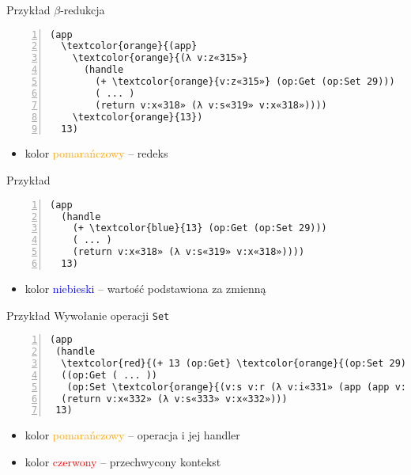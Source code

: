\documentclass{beamer}
\begin{document}
\begin{frame}[fragile]{Przykład}
$\beta$-redukcja
\begin{Verbatim}[commandchars=\\\{\},numbers=left]
(app
  \textcolor{orange}{(app}
    \textcolor{orange}{(λ v:z«315»}
      (handle
        (+ \textcolor{orange}{v:z«315»} (op:Get (op:Set 29)))
        ( ... )
        (return v:x«318» (λ v:s«319» v:x«318»))))
    \textcolor{orange}{13})
  13)
\end{Verbatim}
\begin{itemize}
  \item kolor \textcolor{orange}{pomarańczowy} -- redeks
\end{itemize}
\end{frame}

\begin{frame}[fragile]{Przykład}
\begin{Verbatim}[commandchars=\\\{\},numbers=left]
(app
  (handle
    (+ \textcolor{blue}{13} (op:Get (op:Set 29)))
    ( ... )
    (return v:x«318» (λ v:s«319» v:x«318»))))
  13)
\end{Verbatim}
\begin{itemize}
  \item kolor \textcolor{blue}{niebieski} -- wartość podstawiona za zmienną
\end{itemize}
\end{frame}

\begin{frame}[fragile]{Przykład}
Wywołanie operacji \texttt{Set}
\begin{Verbatim}[commandchars=\\\{\},numbers=left]
(app
 (handle
  \textcolor{red}{(+ 13 (op:Get} \textcolor{orange}{(op:Set 29)}\textcolor{red}{))}
  ((op:Get ( ... ))
   (op:Set \textcolor{orange}{(v:s v:r (λ v:i«331» (app (app v:r 0) v:s)))}))
  (return v:x«332» (λ v:s«333» v:x«332»)))
 13)
\end{Verbatim}
\begin{itemize}
  \item kolor \textcolor{orange}{pomarańczowy} -- operacja i jej handler
  \item kolor \textcolor{red}{czerwony} -- przechwycony kontekst
\end{itemize}
\end{frame}
\end{document}
